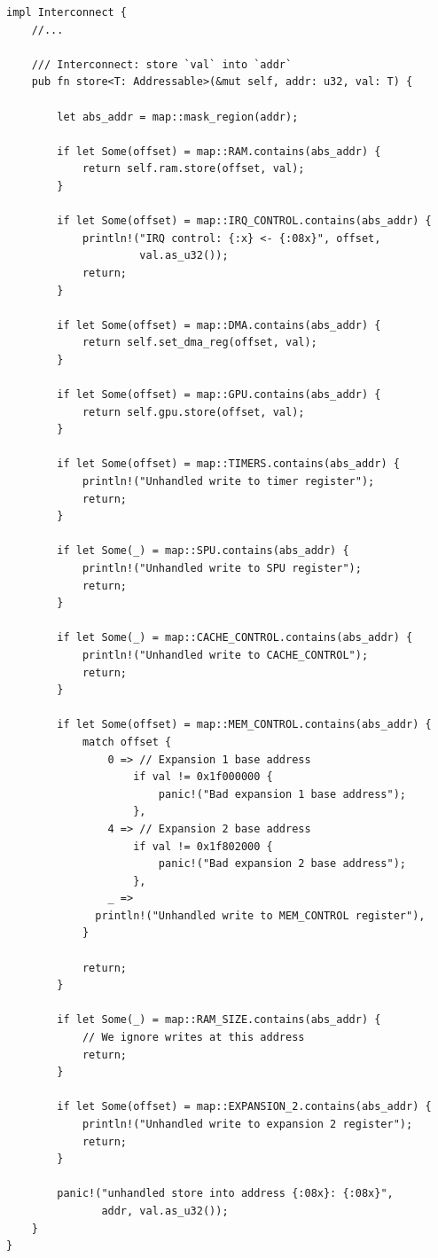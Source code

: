 \documentclass[a4paper]{article}
\begin{document}
\begin{lstlisting}
impl Interconnect {
    //...

    /// Interconnect: store `val` into `addr`
    pub fn store<T: Addressable>(&mut self, addr: u32, val: T) {

        let abs_addr = map::mask_region(addr);

        if let Some(offset) = map::RAM.contains(abs_addr) {
            return self.ram.store(offset, val);
        }

        if let Some(offset) = map::IRQ_CONTROL.contains(abs_addr) {
            println!("IRQ control: {:x} <- {:08x}", offset,
                     val.as_u32());
            return;
        }

        if let Some(offset) = map::DMA.contains(abs_addr) {
            return self.set_dma_reg(offset, val);
        }

        if let Some(offset) = map::GPU.contains(abs_addr) {
            return self.gpu.store(offset, val);
        }

        if let Some(offset) = map::TIMERS.contains(abs_addr) {
            println!("Unhandled write to timer register");
            return;
        }

        if let Some(_) = map::SPU.contains(abs_addr) {
            println!("Unhandled write to SPU register");
            return;
        }

        if let Some(_) = map::CACHE_CONTROL.contains(abs_addr) {
            println!("Unhandled write to CACHE_CONTROL");
            return;
        }

        if let Some(offset) = map::MEM_CONTROL.contains(abs_addr) {
            match offset {
                0 => // Expansion 1 base address
                    if val != 0x1f000000 {
                        panic!("Bad expansion 1 base address");
                    },
                4 => // Expansion 2 base address
                    if val != 0x1f802000 {
                        panic!("Bad expansion 2 base address");
                    },
                _ =>
              println!("Unhandled write to MEM_CONTROL register"),
            }

            return;
        }

        if let Some(_) = map::RAM_SIZE.contains(abs_addr) {
            // We ignore writes at this address
            return;
        }

        if let Some(offset) = map::EXPANSION_2.contains(abs_addr) {
            println!("Unhandled write to expansion 2 register");
            return;
        }

        panic!("unhandled store into address {:08x}: {:08x}",
               addr, val.as_u32());
    }
}
\end{lstlisting}
\end{document}
